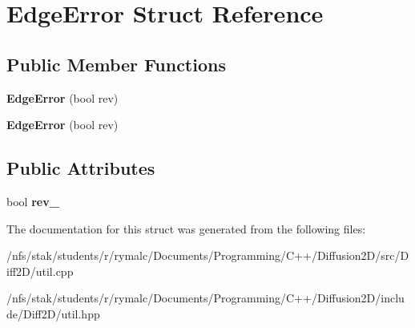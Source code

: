 \hypertarget{structEdgeError}{
\section{EdgeError Struct Reference}
\label{structEdgeError}
}
\subsection*{Public Member Functions}
\begin{DoxyCompactItemize}
\item 
\hypertarget{structEdgeError_a92ca9588f65b2b4d17139ff80eb29ab3}{
{\bfseries EdgeError} (bool rev)}
\label{structEdgeError_a92ca9588f65b2b4d17139ff80eb29ab3}

\item 
\hypertarget{structEdgeError_a92ca9588f65b2b4d17139ff80eb29ab3}{
{\bfseries EdgeError} (bool rev)}
\label{structEdgeError_a92ca9588f65b2b4d17139ff80eb29ab3}

\end{DoxyCompactItemize}
\subsection*{Public Attributes}
\begin{DoxyCompactItemize}
\item 
\hypertarget{structEdgeError_a704a81b20878f5b534df310ea179ae02}{
bool {\bfseries rev\_\-}}
\label{structEdgeError_a704a81b20878f5b534df310ea179ae02}

\end{DoxyCompactItemize}


The documentation for this struct was generated from the following files:\begin{DoxyCompactItemize}
\item 
/nfs/stak/students/r/rymalc/Documents/Programming/C++/Diffusion2D/src/Diff2D/util.cpp\item 
/nfs/stak/students/r/rymalc/Documents/Programming/C++/Diffusion2D/include/Diff2D/util.hpp\end{DoxyCompactItemize}
